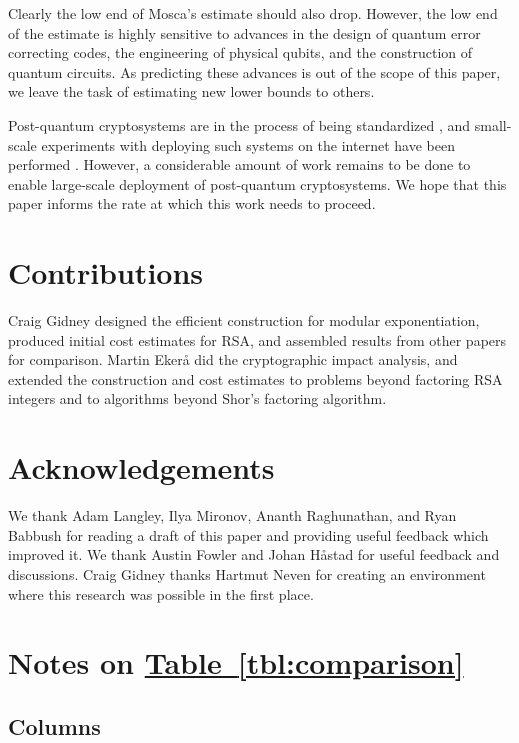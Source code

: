 \documentclass[superscriptaddress,notitlepage,longbibliography]{revtex4-1}
\theoremstyle{definition}
\theoremstyle{definition}
\newcommand{\tbl}[1]{\hyperref[tbl:#1]{Table~\ref*{tbl:#1}}}
\begin{document}
Clearly the low end of Mosca's estimate should also drop.
However, the low end of the estimate is highly sensitive to advances in the design of quantum error correcting codes, the engineering of physical qubits, and the construction of quantum circuits.
As predicting these advances is out of the scope of this paper, we leave the task of estimating new lower bounds to others.

Post-quantum cryptosystems are in the process of being standardized \cite{alagic2019status}, and small-scale experiments with deploying such systems on the internet have been performed \cite{google2016postquantum}.
However, a considerable amount of work remains to be done to enable large-scale deployment of post-quantum cryptosystems.
We hope that this paper informs the rate at which this work needs to proceed.


\section{Contributions}
Craig Gidney designed the efficient construction for modular exponentiation, produced initial cost estimates for RSA, and assembled results from other papers for comparison.
Martin Ekerå did the cryptographic impact analysis, and extended the construction and cost estimates to problems beyond factoring RSA integers and to algorithms beyond Shor's factoring algorithm.

\section{Acknowledgements}
We thank Adam Langley, Ilya Mironov, Ananth Raghunathan, and Ryan Babbush for reading a draft of this paper and providing useful feedback which improved it.
We thank Austin Fowler and Johan Håstad for useful feedback and discussions.
Craig Gidney thanks Hartmut Neven for creating an environment where this research was possible in the first place.


\appendix

\section{Notes on \texorpdfstring{\tbl{comparison}}{Table I}}
\label{app:table-details}

\subsection{Columns}
\end{document}
